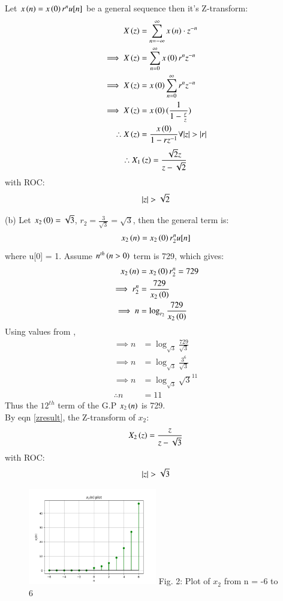 \documentclass[journal,12pt,twocolumn]{IEEEtran}
\theoremstyle{remark}
\begin{document}
Let $x\left(n\right) = x\left(0\right)r^nu[n]$ be a general sequence then it's Z-transform:
\begin{align}
    X\left(z\right) &= \sum_{n = -\infty}^{\infty}{x\left(n\right) \cdot z^{-n}}\\
    \implies X\left(z\right) &= \sum_{n = 0}^{\infty}{x\left(0\right)r^{n}z^{-n}}\\
    \implies X\left(z\right) &= x\left(0\right)\sum_{n = 0}^{\infty}{r^n z^{-n}}\\
    \implies X\left(z\right) &= x\left(0\right)(\frac{1}{1 - \frac{r}{z}})\\
	\therefore X\left(z\right) &= \frac{x\left(0\right)}{1 - rz^{-1}} \forall {\left\vert z\right\vert > \left\vert r\right\vert} \label{zresult}
\end{align}
\begin{align}
    \therefore X_1\left(z\right) = \frac{\sqrt{2}z}{z - \sqrt{2}}
\end{align}
with ROC: \[ \left\vert z\right\vert > \sqrt{2} \]

(b) Let $x_2\left(0\right) = \sqrt{3}$, $r_2 = \frac{3}{\sqrt{3}} = \sqrt{3}$, then the general term is:
\begin{align}
    x_2\left(n\right) = x_2\left(0\right) r_2^nu[n]
\end{align}
where u[0] = 1. Assume $n^{th}\left(n > 0\right)$ term is 729, which gives: 
\begin{align}
    x_2\left(n\right) &= x_2\left(0\right) r_2^n = 729\\
    \implies r_2^n &= \frac{729}{x_2\left(0\right)}\\
    \implies n &= \log_{r_2}{\frac{729}{x_2\left(0\right)}}
\end{align}
Using values from ,
\begin{align}
    \implies n &= \log_{\sqrt{3}}{\frac{729}{\sqrt{3}}}\\
    \implies n &= \log_{\sqrt{3}}{\frac{3^6}{\sqrt{3}}}\\
    \implies n &= \log_{\sqrt{3}}{\sqrt{3}^{11}}\\
    \therefore n &= 11
\end{align}
Thus the $12^{th}$ term of the G.P $x_2\left(n\right)$ is 729. \\

By eqn \ref{zresult}, the Z-transform of $x_2$:
\begin{align} X_2\left(z\right) = \frac{z}{z - \sqrt{3}} \end{align}
with ROC: \[ \left\vert z\right\vert > \sqrt{3} \]

\begin{figure}[h!]
    \centering
    \includegraphics[width=0.5\textwidth]{figs/b.png}
    Fig. 2: Plot of $x_2$ from n = -6 to 6
    \label{fig:img2}
\end{figure}
\end{document}
